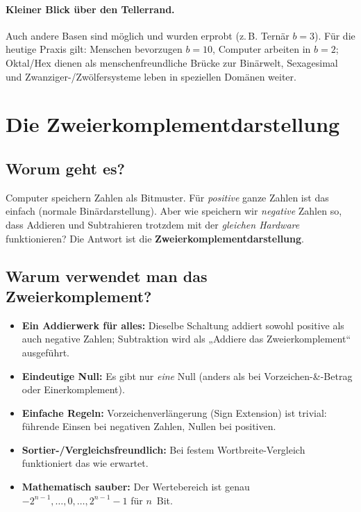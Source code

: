 \documentclass[12pt,a4paper]{book}
\begin{document}
\paragraph{Kleiner Blick über den Tellerrand.}
Auch andere Basen sind möglich und wurden erprobt (z.\,B. Ternär \(b=3\)).
Für die heutige Praxis gilt: Menschen bevorzugen \(b=10\), Computer arbeiten in \(b=2\); Oktal/Hex dienen als menschenfreundliche Brücke zur Binärwelt, Sexagesimal und Zwanziger-/Zwölfersysteme leben in speziellen Domänen weiter.

\section{Die Zweierkomplementdarstellung}

\subsection{Worum geht es?}
Computer speichern Zahlen als Bitmuster. Für \emph{positive} ganze Zahlen ist das einfach (normale Binärdarstellung). 
Aber wie speichern wir \emph{negative} Zahlen so, dass Addieren und Subtrahieren trotzdem mit der \emph{gleichen Hardware} funktionieren?
Die Antwort ist die \textbf{Zweierkomplementdarstellung}.

\subsection{Warum verwendet man das Zweierkomplement?}
\begin{itemize}
	\item \textbf{Ein Addierwerk für alles:} Dieselbe Schaltung addiert sowohl positive als auch negative Zahlen; Subtraktion wird als „Addiere das Zweierkomplement“ ausgeführt.
	\item \textbf{Eindeutige Null:} Es gibt nur \emph{eine} Null (anders als bei Vorzeichen-\&-Betrag oder Einerkomplement).
	\item \textbf{Einfache Regeln:} Vorzeichenverlängerung (Sign Extension) ist trivial: führende Einsen bei negativen Zahlen, Nullen bei positiven.
	\item \textbf{Sortier-/Vergleichsfreundlich:} Bei festem Wortbreite-Vergleich funktioniert das wie erwartet.
	\item \textbf{Mathematisch sauber:} Der Wertebereich ist genau \(-2^{n-1},\ldots,0,\ldots,2^{n-1}-1\) für \(n\)~Bit.
\end{itemize}
\end{document}
